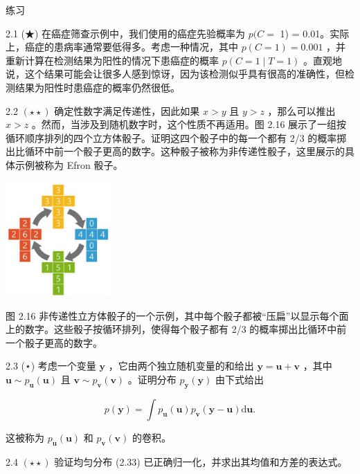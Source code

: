 \documentclass[10pt]{report}
\begin{document}
练习

2.1 (★) 在癌症筛查示例中，我们使用的癌症先验概率为 \(p(C =\) 1) = 0.01。实际上，癌症的患病率通常要低得多。考虑一种情况，其中 \(p\left( {C = 1}\right)  = {0.001}\) ，并重新计算在检测结果为阳性的情况下患癌症的概率 \(p\left( {C = 1 \mid  T = 1}\right)\) 。直观地说，这个结果可能会让很多人感到惊讶，因为该检测似乎具有很高的准确性，但检测结果为阳性时患癌症的概率仍然很低。

2.2 \(\left( {\star  \star  }\right)\) 确定性数字满足传递性，因此如果 \(x > y\) 且 \(y > z\) ，那么可以推出 \(x > z\) 。然而，当涉及到随机数字时，这个性质不再适用。图 2.16 展示了一组按循环顺序排列的四个立方体骰子。证明这四个骰子中的每一个都有 2/3 的概率掷出比循环中前一个骰子更高的数字。这种骰子被称为非传递性骰子，这里展示的具体示例被称为 Efron 骰子。

\begin{center}
\includegraphics[max width=0.3\textwidth]{images/0194e279-9b28-703a-88f4-c3ac21e2010d_77_1048_1104_393_430_0.jpg}
\end{center}
\hspace*{3em} 

图 2.16 非传递性立方体骰子的一个示例，其中每个骰子都被“压扁”以显示每个面上的数字。这些骰子按循环排列，使得每个骰子都有 2/3 的概率掷出比循环中前一个骰子更高的数字。

2.3 (⋆) 考虑一个变量 \(\mathbf{y}\) ，它由两个独立随机变量的和给出 \(\mathbf{y} = \mathbf{u} + \mathbf{v}\) ，其中 \(\mathbf{u} \sim  {p}_{\mathbf{u}}\left( \mathbf{u}\right)\) 且 \(\mathbf{v} \sim  {p}_{\mathbf{v}}\left( \mathbf{v}\right)\) 。证明分布 \({p}_{\mathbf{y}}\left( \mathbf{y}\right)\) 由下式给出

\[
p\left( \mathbf{y}\right)  = \int {p}_{\mathbf{u}}\left( \mathbf{u}\right) {p}_{\mathbf{v}}\left( {\mathbf{y} - \mathbf{u}}\right) \mathrm{d}\mathbf{u}. \tag{2.119}
\]

这被称为 \({p}_{\mathbf{u}}\left( \mathbf{u}\right)\) 和 \({p}_{\mathbf{v}}\left( \mathbf{v}\right)\) 的卷积。

2.4 \(\left( {\star  \star  }\right)\) 验证均匀分布 (2.33) 已正确归一化，并求出其均值和方差的表达式。
\end{document}
